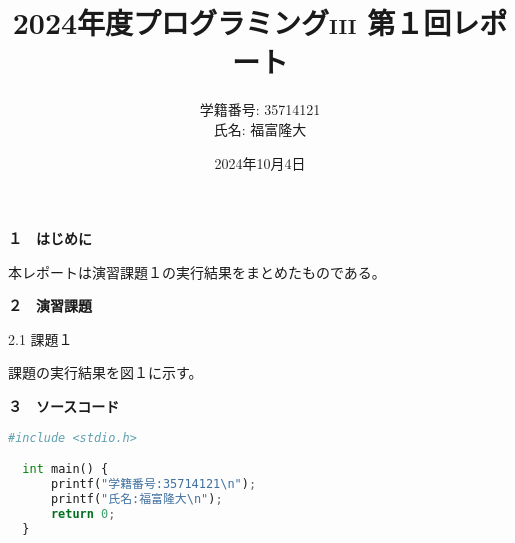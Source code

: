 \documentclass[a4j]{jsarticle}
\title{2024年度プログラミング\textsc{iii} 第１回レポート}
\author{学籍番号: 35714121 \\ 氏名: 福富隆大}
\date{2024年10月4日}
\begin{document}
\maketitle

\textbf{１　はじめに}

本レポートは演習課題１の実行結果をまとめたものである。

\textbf{２　演習課題}

\textmd{2.1 課題１}

課題の実行結果を図１に示す。


\textbf{３　ソースコード}

\begin{lstlisting}[language=Python, basicstyle=\ttfamily\small, frame=single]
  #include <stdio.h>

  int main() {
      printf("学籍番号:35714121\n");
      printf("氏名:福富隆大\n");
      return 0;
  }
\end{lstlisting}
\end{document}
